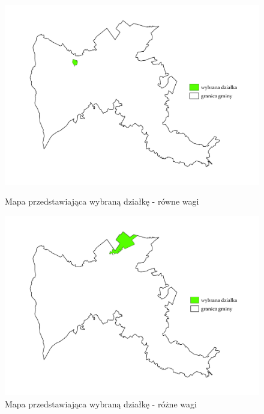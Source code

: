 \documentclass{article}
\begin{document}
\begin{figure}[H]
    \begin{minipage}[t]{0.48\textwidth}
        \centering
        \includegraphics[width=\linewidth]{img/wybrana-dzialka.jpg}
        \caption{Mapa przedstawiająca wybraną działkę - równe wagi}
        \label{fig:dzialki-linie-rowne}
    \end{minipage}
    \hfill
    \begin{minipage}[t]{0.48\textwidth}
        \centering
        \includegraphics[width=\linewidth]{img/roznewagi-wybrana-dzialka.jpg}
        \caption{Mapa przedstawiająca wybraną działkę - różne wagi}
        \label{fig:dzialki-linie-rowne}
    \end{minipage}
\end{figure}
\newpage
\end{document}
